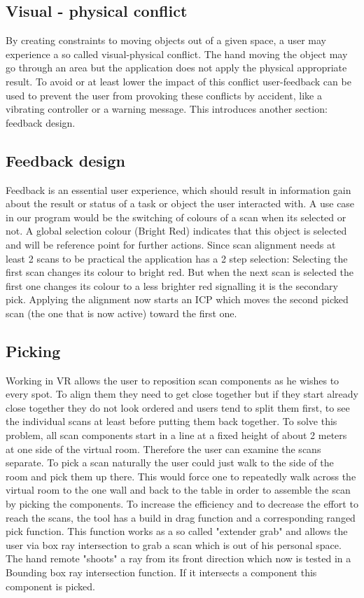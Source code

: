 \documentclass[hyperref,english,bachelorofscience,bibnum,twoside]{cgvpub}
\begin{document}
\subsection{Visual - physical conflict}

By creating constraints to moving objects out of a given space, a user may experience a so called visual-physical conflict. The hand moving the object may go through an area but the application does not apply the physical appropriate result\cite{Jerald2015}.
To avoid or at least lower the impact of this conflict user-feedback can be used to prevent the user from provoking these conflicts by accident, like a vibrating controller or a warning message. This introduces another section: feedback design.

\subsection{Feedback design}

Feedback is an essential user experience, which should result in information gain about the result or status of a task or object the user interacted with\cite{Jerald2015}.
A use case in our program would be the switching of colours of a scan when its selected or not. A global selection colour (Bright Red) indicates that this object is selected and will be reference point for further actions. Since scan alignment needs at least 2 scans to be practical the application has a 2 step selection:
Selecting the first scan changes its colour to bright red. But when the next scan is selected the first one changes its colour to a less brighter red signalling it is the secondary pick. Applying the alignment now starts an ICP which moves the second picked scan (the one that is now active) toward the first one.

\subsection{Picking}

Working in VR allows the user to reposition scan components as he wishes to every spot. To align them they need to get close together but if they start already close together they do not look ordered and users tend to split them first, to see the individual scans at least before putting them back together. To solve this problem, all scan components start in a line at a fixed height of about 2 meters at one side of the virtual room. Therefore the user can examine the scans separate.
To pick a scan naturally the user could just walk to the side of the room and pick them up there. This would force one to repeatedly walk across the virtual room to the one wall and back to the table in order to assemble the scan by picking the components. To increase the efficiency and to decrease the effort to reach the scans, the tool has a build in drag function and a corresponding ranged pick function. This function works as a so called "extender grab"\cite{Jerald2015} %
and allows the user via box ray intersection to grab a scan which is out of his personal space.
The hand remote "shoots" a ray from its front direction which now is tested in a Bounding box ray intersection function. If it intersects a component this component is picked.
\end{document}
